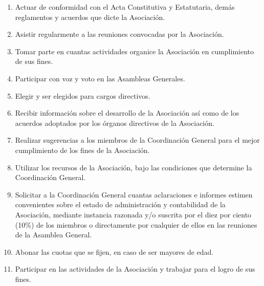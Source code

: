         \begin{enumerate}

          \item 
            Actuar de conformidad con el Acta Constitutiva y Estatutaria,
            dem\'as reglamentos y acuerdos que dicte la Asociaci\'on.
          
          \item 
            Asistir regularmente a las reuniones convocadas por la Asociaci\'on.
          
          \item
            Tomar parte en cuantas actividades organice la Asociaci\'on en
            cumplimiento de sus fines.

          \item
            Participar con voz y voto en las Asambleas Generales.

          \item 
            Elegir y ser elegidos para cargos directivos.

          \item
            Recibir informaci\'on sobre el desarrollo de la Asociaci\'on as\'i{}
            como de los acuerdos adoptados por los \'organos directivos de la
            Asociaci\'on.

          \item
            Realizar sugerencias a los miembros de la Coordinaci\'on General
            para el mejor cumplimiento de los fines de la Asociaci\'on.

          \item
            Utilizar los recursos de la Asociaci\'on, bajo las condiciones que
            determine la Coordinaci\'on General.

          \item
            Solicitar a la Coordinaci\'on General cuantas aclaraciones e
            informes estimen convenientes sobre el estado de administraci\'on y
            contabilidad de la Asociaci\'on, mediante instancia razonada y/o
            suscrita por el diez por ciento (10\%) de los miembros o
            directamente por cualquier de ellos en las reuniones de la Asamblea
            General.

          \item
            Abonar las cuotas que se fijen, en caso de ser mayores de edad.

          \item
            Participar en las actividades de la Asociaci\'on y trabajar para el
            logro de sus fines.


\end{enumerate}
